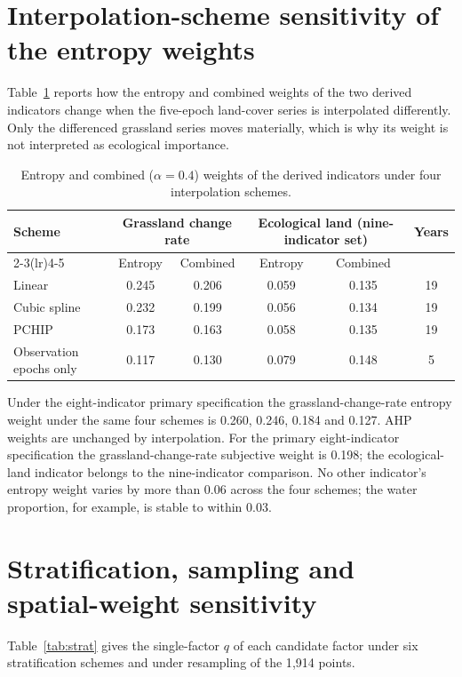 \documentclass[preprint,11pt,authoryear]{elsarticle}
\begin{document}
\section{Interpolation-scheme sensitivity of the entropy weights}
\label{app:interp}
Table~\ref{tab:interp} reports how the entropy and combined weights of the two derived indicators change when the five-epoch land-cover series is interpolated differently. Only the differenced grassland series moves materially, which is why its weight is not interpreted as ecological importance.

\begin{table}[htbp]
\centering
\caption{Entropy and combined ($\alpha=0.4$) weights of the derived indicators under four interpolation schemes.}
\label{tab:interp}
\footnotesize
\setlength{\tabcolsep}{4pt}
\begin{tabular}{lccccc}
\toprule
Scheme & \multicolumn{2}{c}{Grassland change rate} & \multicolumn{2}{c}{Ecological land (nine-indicator set)} & Years \\
\cmidrule(lr){2-3}\cmidrule(lr){4-5}
 & Entropy & Combined & Entropy & Combined & \\
\midrule
Linear & 0.245 & 0.206 & 0.059 & 0.135 & 19 \\
Cubic spline & 0.232 & 0.199 & 0.056 & 0.134 & 19 \\
PCHIP & 0.173 & 0.163 & 0.058 & 0.135 & 19 \\
Observation epochs only & 0.117 & 0.130 & 0.079 & 0.148 & 5 \\
\bottomrule
\end{tabular}

\vspace{2pt}
{\scriptsize Under the eight-indicator primary specification the grassland-change-rate entropy weight under the same four schemes is 0.260, 0.246, 0.184 and 0.127. AHP weights are unchanged by interpolation. For the primary eight-indicator specification the grassland-change-rate subjective weight is 0.198; the ecological-land indicator belongs to the nine-indicator comparison. No other indicator's entropy weight varies by more than 0.06 across the four schemes; the water proportion, for example, is stable to within 0.03.}
\end{table}

\section{Stratification, sampling and spatial-weight sensitivity}
\label{app:strat}
Table~\ref{tab:strat} gives the single-factor $q$ of each candidate factor under six stratification schemes and under resampling of the 1{,}914 points.
\end{document}
